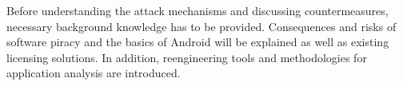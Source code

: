 Before understanding the attack mechanisms and discussing countermeasures, necessary background knowledge has to be provided.
Consequences and risks of software piracy and the basics of Android will be explained as well as existing licensing solutions.
In addition, reengineering tools and methodologies for application analysis are introduced.
